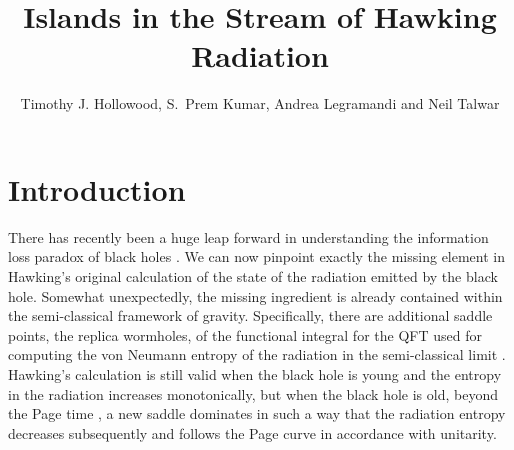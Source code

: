 \documentclass[12pt]{article}
\title{Islands in the Stream of Hawking Radiation}
\author{Timothy J. Hollowood, S.~Prem Kumar, Andrea Legramandi and Neil Talwar}
\affiliation{Department of Physics, Swansea University, Swansea, SA2 8PP, U.K.}
\begin{document}
\maketitle


\newpage


\tableofcontents


\section{Introduction}

There has recently been a huge leap forward in understanding the information loss paradox of black holes  \cite{Penington:2019kki,Almheiri:2019qdq}. We can now pinpoint exactly the missing element in Hawking's original calculation \cite{Hawking:1974sw,Hawking:1976ra} of the state of the radiation emitted by the black hole. Somewhat unexpectedly, the missing ingredient is already contained within the  semi-classical framework of gravity.  Specifically, there are additional saddle points, the replica wormholes, of the functional integral  for  the QFT  used for computing the von Neumann entropy of the radiation in the semi-classical limit \cite{Penington:2019kki,Almheiri:2019qdq,Almheiri:2020cfm}. Hawking's calculation 
is still valid when the black hole is young and the entropy in the radiation increases monotonically, but when the black hole is old, beyond the Page time \cite{Page:1993wv,Page:2013dx}, a new saddle dominates in such a way that the radiation entropy   decreases subsequently and follows the Page curve in accordance with unitarity.
\end{document}
